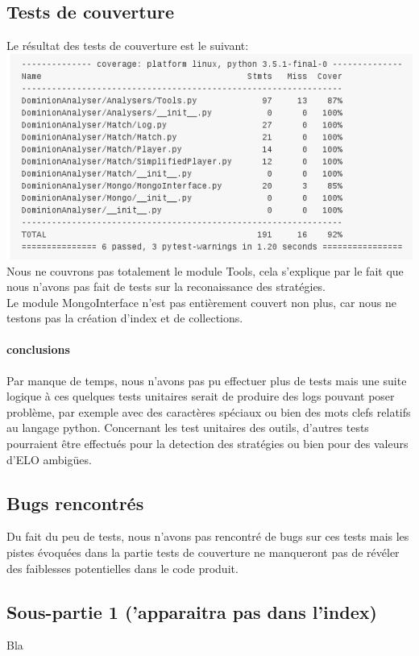\subsection{Tests de couverture}
Le résultat des tests de couverture est le suivant:\\
\includegraphics[scale=0.35,keepaspectratio]{./coverage_python_code}
Nous ne couvrons pas totalement le module Tools, cela s'explique par le fait que nous n'avons pas fait de tests sur la reconaissance des stratégies.\\
Le module MongoInterface n'est pas entièrement couvert non plus, car nous ne testons pas la création d'index et de collections.


\paragraph{conclusions}
Par manque de temps, nous n'avons pas pu effectuer plus de tests mais une suite logique à ces quelques tests unitaires serait de produire des logs pouvant poser problème, par exemple avec des caractères spéciaux ou bien des mots clefs relatifs au langage python. Concernant les test unitaires des outils, d'autres tests pourraient être effectués pour la detection des stratégies ou bien pour des valeurs d'ELO ambigües.



\subsection{Bugs rencontrés}
Du fait du peu de tests, nous n'avons pas rencontré de bugs sur ces tests mais les pistes évoquées dans la partie tests de couverture ne manqueront pas de révéler des faiblesses potentielles dans le code produit.

\iffalse
\subsection*{Sous-partie 1 ('apparaitra pas dans l'index)} Bla



